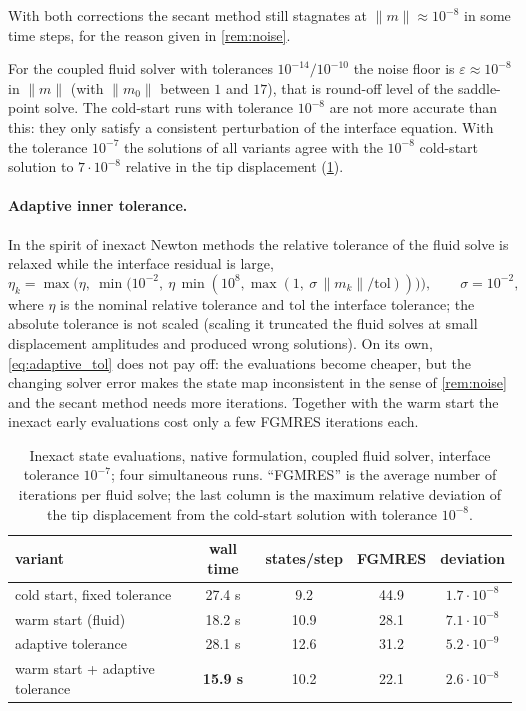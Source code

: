 \documentclass[11pt,a4paper]{article}
\theoremstyle{definition}
\theoremstyle{remark}
\begin{document}
With both corrections the secant method still stagnates at $\|m\|\approx10^{-8}$ in some time
steps, for the reason given in \cref{rem:noise}.



For the coupled fluid solver with tolerances $10^{-14}/10^{-10}$ the noise floor is
$\varepsilon\approx10^{-8}$ in $\|m\|$ (with $\|m_0\|$ between $1$ and $17$), that is round-off level
of the saddle-point solve. The cold-start runs with tolerance $10^{-8}$ are not more accurate than
this: they only satisfy a consistent perturbation of the interface equation. With the tolerance
$10^{-7}$ the solutions of all variants agree with the $10^{-8}$ cold-start solution to
$7\cdot10^{-8}$ relative in the tip displacement (\cref{tab:inexact}).

\paragraph{Adaptive inner tolerance.} In the spirit of inexact Newton methods
\cite{DemboEisenstatSteihaug1982} the relative tolerance of the fluid solve is relaxed while the
interface residual is large,
\begin{equation}\label{eq:adaptive_tol}
  \eta_k=\max\Big(\eta,\ \min\big(10^{-2},\ \eta\,\min(10^8,\max(1,\
  \sigma\,\|m_k\|/\mathrm{tol}))\big)\Big),\qquad \sigma=10^{-2},
\end{equation}
where $\eta$ is the nominal relative tolerance and $\mathrm{tol}$ the interface tolerance; the
absolute tolerance is not scaled (scaling it truncated the fluid solves at small displacement
amplitudes and produced wrong solutions). On its own, \eqref{eq:adaptive_tol} does not pay off: the
evaluations become cheaper, but the changing solver error makes the state map inconsistent in the
sense of \cref{rem:noise} and the secant method needs more iterations. Together with the warm start
the inexact early evaluations cost only a few FGMRES iterations each.

\begin{table}[ht]\centering
\caption{Inexact state evaluations, native formulation, coupled fluid solver, interface tolerance
$10^{-7}$; four simultaneous runs. ``FGMRES'' is the average number of iterations per fluid solve;
the last column is the maximum relative deviation of the tip displacement from the cold-start
solution with tolerance $10^{-8}$.}\label{tab:inexact}
\begin{tabular}{lcccc}
\toprule
variant & wall time & states/step & FGMRES & deviation\\
\midrule
cold start, fixed tolerance & 27.4 s & 9.2 & 44.9 & $1.7\cdot10^{-8}$\\
warm start (fluid) & 18.2 s & 10.9 & 28.1 & $7.1\cdot10^{-8}$\\
adaptive tolerance & 28.1 s & 12.6 & 31.2 & $5.2\cdot10^{-9}$\\
warm start + adaptive tolerance & \textbf{15.9 s} & 10.2 & 22.1 & $2.6\cdot10^{-8}$\\
\bottomrule
\end{tabular}
\end{table}
\end{document}
